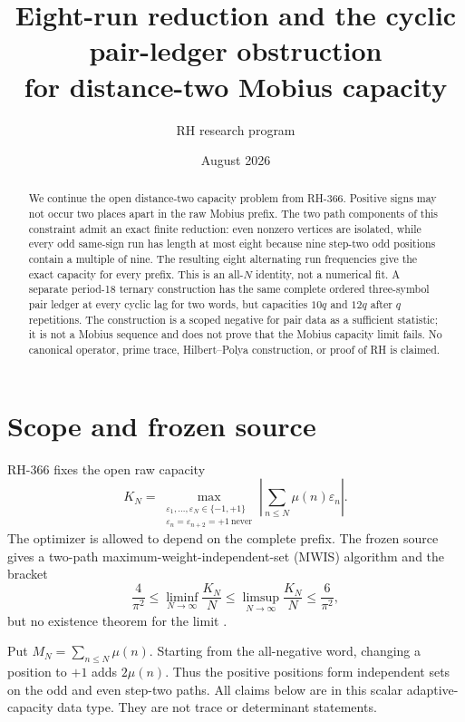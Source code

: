 \documentclass[11pt]{article}
\title{Eight-run reduction and the cyclic pair-ledger obstruction\\
for distance-two Mobius capacity}
\author{RH research program}
\date{August 2026}
\newcommand{\Mob}{\mu}
\begin{document}
\maketitle

\begin{abstract}
We continue the open distance-two capacity problem from RH-366.  Positive
signs may not occur two places apart in the raw Mobius prefix.  The two path
components of this constraint admit an exact finite reduction: even nonzero
vertices are isolated, while every odd same-sign run has length at most eight
because nine step-two odd positions contain a multiple of nine.  The resulting
eight alternating run frequencies give the exact capacity for every prefix.
This is an all-$N$ identity, not a numerical fit.  A separate period-18
ternary construction has the same complete ordered three-symbol pair ledger
at every cyclic lag for two words, but capacities $10q$ and $12q$ after $q$
repetitions.  The construction is a scoped negative for pair data as a
sufficient statistic; it is not a Mobius sequence and does not prove that the
Mobius capacity limit fails.  No canonical operator, prime trace,
Hilbert--Polya construction, or proof of RH is claimed.
\end{abstract}

\section{Scope and frozen source}

RH-366 fixes the open raw capacity
\begin{equation}
 K_N=\max_{\substack{\varepsilon_1,\ldots,\varepsilon_N\in\{-1,+1\}\\
 \varepsilon_n=\varepsilon_{n+2}=+1\ \text{never}}}
 \left|\sum_{n\leq N}\Mob(n)\varepsilon_n\right|.
 \label{eq:capacity}
\end{equation}
The optimizer is allowed to depend on the complete prefix.  The frozen
source gives a two-path maximum-weight-independent-set (MWIS) algorithm and
the bracket
\begin{equation}
 \frac4{\pi^2}\leq\liminf_{N\to\infty}\frac{K_N}{N}
 \leq\limsup_{N\to\infty}\frac{K_N}{N}\leq\frac6{\pi^2},
 \label{eq:oldbracket}
\end{equation}
but no existence theorem for the limit \cite{rh366,capacitysource}.

Put $M_N=\sum_{n\leq N}\Mob(n)$.  Starting from the all-negative word,
changing a position to $+1$ adds $2\Mob(n)$.  Thus the positive positions
form independent sets on the odd and even step-two paths.  All claims below
are in this scalar adaptive-capacity data type.  They are not trace or
determinant statements.
\end{document}
